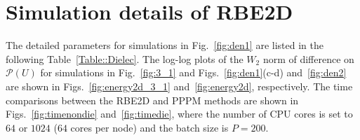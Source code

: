 


\section{Simulation details of RBE2D}

The detailed parameters for simulations in Fig.~\ref{fig:den1} are listed in the following Table~\ref{Table::Dielec}.  {The log-log plots of the $W_2$ norm of difference on $\mathscr{P}(U)$ for simulations in Fig.~\ref{fig:3_1} and Figs.~\ref{fig:den1}(c-d) and~\ref{fig:den2} are shown in Figs.~\ref{fig:energy2d_3_1} and~\ref{fig:energy2d}, respectively.}
 {The time comparisons between the RBE2D and PPPM methods are shown in Figs.~\ref{fig:timenondie} and~\ref{fig:timedie}, where the number of CPU cores is set to $64$ or $1024$ ($64$ cores per node) and the batch size is $P=200$.}

